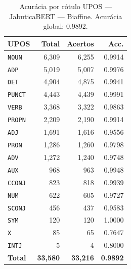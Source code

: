 \begin{table}[ht]
\centering
\footnotesize
\begin{tabular}{lrrr}
\toprule
\textbf{UPOS} & \textbf{Total} & \textbf{Acertos} & \textbf{Acc.} \\
\midrule
\texttt{NOUN} & 6,309 & 6,255 & 0.9914 \\
\texttt{ADP} & 5,019 & 5,007 & 0.9976 \\
\texttt{DET} & 4,904 & 4,875 & 0.9941 \\
\texttt{PUNCT} & 4,443 & 4,439 & 0.9991 \\
\texttt{VERB} & 3,368 & 3,322 & 0.9863 \\
\texttt{PROPN} & 2,209 & 2,190 & 0.9914 \\
\texttt{ADJ} & 1,691 & 1,616 & 0.9556 \\
\texttt{PRON} & 1,286 & 1,260 & 0.9798 \\
\texttt{ADV} & 1,272 & 1,240 & 0.9748 \\
\texttt{AUX} & 968 & 963 & 0.9948 \\
\texttt{CCONJ} & 823 & 818 & 0.9939 \\
\texttt{NUM} & 622 & 605 & 0.9727 \\
\texttt{SCONJ} & 456 & 437 & 0.9583 \\
\texttt{SYM} & 120 & 120 & 1.0000 \\
\texttt{X} & 85 & 65 & 0.7647 \\
\texttt{INTJ} & 5 & 4 & 0.8000 \\
\midrule
\textbf{Total} & \textbf{33,580} & \textbf{33,216} & \textbf{0.9892} \\
\bottomrule
\end{tabular}
\caption{Acurácia por rótulo UPOS — JabuticaBERT — Biaffine. Acurácia global: 0.9892.}
\label{tab:upos-acc-predict-test-df-jabuticabert-biaffine}
\end{table}



